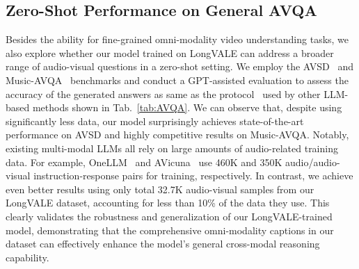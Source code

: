   
\begin{table}
  \centering
  \vspace{-1.5mm}
  \caption{Comparison with existing LLM-based methods on open-ended audio-visual question answering benchmarks on a zero-shot setting. \# Pairs: the adopted instruction-response pairs.}
  \label{tab:AVQA}
  \vspace{-5mm}
\end{table}

\subsection{Zero-Shot Performance on General AVQA}
Besides the ability for fine-grained omni-modality video understanding tasks, we also explore whether our model trained on LongVALE can address a broader range of audio-visual questions in a zero-shot setting. 
We employ the AVSD~\cite{alamri2019audio} and Music-AVQA~\cite{li2022learning} benchmarks and conduct a GPT-assisted evaluation to assess the accuracy of the generated answers as same as the protocol~\cite{maaz2023video} used by other LLM-based methods shown in Tab.~\ref{tab:AVQA}.
We can observe that, despite using significantly less data, our model surprisingly achieves state-of-the-art performance on AVSD and highly competitive results on Music-AVQA.  
Notably, existing multi-modal LLMs all rely on large amounts of audio-related training data. 
For example, OneLLM~\cite{han2024onellm} and AVicuna~\cite{tang2024avicuna} use 460K and 350K audio/audio-visual instruction-response pairs for training, respectively. 
In contrast, we achieve even better results using only total 32.7K audio-visual samples from our LongVALE dataset, accounting for less than 10\% of the data they use. 
This clearly validates the robustness and generalization of our LongVALE-trained model, demonstrating that the comprehensive omni-modality captions in our dataset can effectively enhance the model's general cross-modal reasoning capability.


